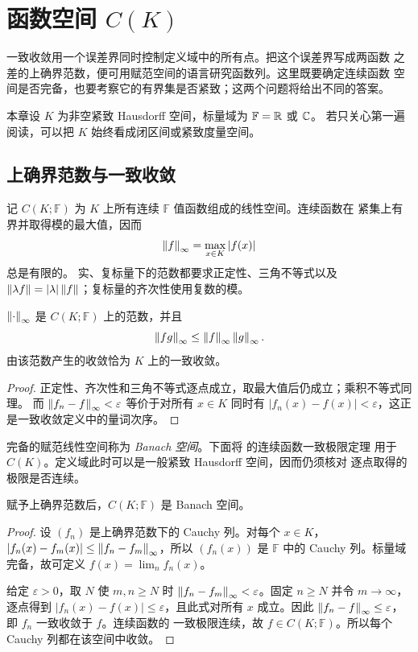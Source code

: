 \chapter{函数空间 \texorpdfstring{$C(K)$}{C(K)}}
\label{chap:continuous-function-space}

一致收敛用一个误差界同时控制定义域中的所有点。把这个误差界写成两函数
之差的上确界范数，便可用赋范空间的语言研究函数列。这里既要确定连续函数
空间是否完备，也要考察它的有界集是否紧致；这两个问题将给出不同的答案。

本章设 $K$ 为非空紧致 Hausdorff 空间，标量域为 $\mathbb F=\mathbb{R}$ 或 $\mathbb{C}$。
若只关心第一遍阅读，可以把 $K$ 始终看成闭区间或紧致度量空间。

\section{上确界范数与一致收敛}

记 $C(K;\mathbb F)$ 为 $K$ 上所有连续 $\mathbb F$ 值函数组成的线性空间。连续函数在
紧集上有界并取得模的最大值，因而
\[
 \left\lVert f\right\rVert_\infty=\max_{x\in K}|f(x)|
\]
总是有限的。
实、复标量下的范数都要求正定性、三角不等式以及
$\left\lVert\lambda f\right\rVert=|\lambda|\left\lVert f\right\rVert$；复标量的齐次性使用复数的模。

\begin{proposition}
\label{prop:sup-norm-on-ck}
$\left\lVert\cdot\right\rVert_\infty$ 是 $C(K;\mathbb F)$ 上的范数，并且
\[
 \left\lVert fg\right\rVert_\infty\le\left\lVert f\right\rVert_\infty\left\lVert g\right\rVert_\infty.
\]
由该范数产生的收敛恰为 $K$ 上的一致收敛。
\end{proposition}

\begin{proof}
正定性、齐次性和三角不等式逐点成立，取最大值后仍成立；乘积不等式同理。
而 $\left\lVert f_n-f\right\rVert_\infty<\varepsilon$ 等价于对所有 $x\in K$ 同时有
$|f_n(x)-f(x)|<\varepsilon$，这正是一致收敛定义中的量词次序。
\end{proof}

完备的赋范线性空间称为 \emph{Banach 空间}。下面将
的连续函数一致极限定理
用于 $C(K)$。定义域此时可以是一般紧致 Hausdorff 空间，因而仍须核对
逐点取得的极限是否连续。

\begin{theorem}
\label{thm:ck-banach}
赋予上确界范数后，$C(K;\mathbb F)$ 是 Banach 空间。
\end{theorem}

\begin{proof}
设 $(f_n)$ 是上确界范数下的 Cauchy 列。对每个 $x\in K$，
$|f_n(x)-f_m(x)|\le\left\lVert f_n-f_m\right\rVert_\infty$，所以 $(f_n(x))$ 是 $\mathbb F$ 中的
Cauchy 列。标量域完备，故可定义
$f(x)=\lim_n f_n(x)$。

给定 $\varepsilon>0$，取 $N$ 使 $m,n\ge N$ 时
$\left\lVert f_n-f_m\right\rVert_\infty<\varepsilon$。固定 $n\ge N$ 并令 $m\to\infty$，
逐点得到 $|f_n(x)-f(x)|\le\varepsilon$，且此式对所有 $x$ 成立。因此
$\left\lVert f_n-f\right\rVert_\infty\le\varepsilon$，即 $f_n$ 一致收敛于 $f$。连续函数的
一致极限连续，故 $f\in C(K;\mathbb F)$。所以每个 Cauchy 列都在该空间中收敛。
\end{proof}

